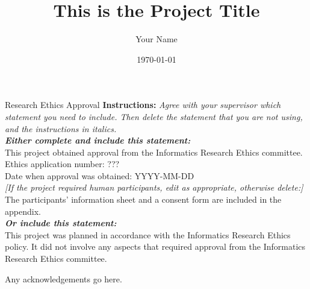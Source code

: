 \documentclass[logo,msc,cyber]{infthesis}   %
\begin{document}
\begin{preliminary}

\title{This is the Project Title}

\author{Your Name}

\date{\today}


\maketitle

\newenvironment{ethics}
   {\begin{frontenv}{Research Ethics Approval}{\LARGE}}
   {\end{frontenv}\newpage}

\begin{ethics}
\textbf{Instructions:} \emph{Agree with your supervisor which
statement you need to include. Then delete the statement that you are not using,
and the instructions in italics.\\
\textbf{Either complete and include this statement:}}\\ %
%
This project obtained approval from the Informatics Research Ethics committee.\\
Ethics application number: ???\\
Date when approval was obtained: YYYY-MM-DD\\
%
\emph{[If the project required human participants, edit as appropriate, otherwise delete:]}\\ %
The participants' information sheet and a consent form are included in the appendix.\\
%
\textbf{\emph{Or include this statement:}}\\ %
This project was planned in accordance with the Informatics Research
Ethics policy. It did not involve any aspects that required approval
from the Informatics Research Ethics committee.

\standarddeclaration
\end{ethics}


\begin{acknowledgements}
Any acknowledgements go here.
\end{acknowledgements}


\tableofcontents
\end{preliminary}
\end{document}
